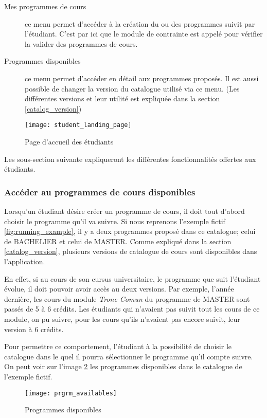 \begin{description}
  \item[Mes programmes de cours] ce menu permet d'accéder à la création du ou des programmes suivit par l'étudiant. C'est par ici que le module de contrainte est appelé pour vérifier la valider des programmes de cours. 
  \item[Programmes disponibles] ce menu permet d'accéder en détail aux programmes proposés. Il est aussi possible de changer la version du catalogue utilisé via ce menu. (Les différentes versions et leur utilité est expliquée dans la section \ref{catalog_version})
\end{description}
\begin{figure}
\centering
\caption{Page d’accueil des étudiants}
\label{fig:student_landing_page}
\texttt{[image: student\_landing\_page]}
\end{figure}

Les sous-section suivante expliqueront les différentes fonctionnalités offertes aux étudiants. 


\subsubsection{Accéder au programmes de cours disponibles}
Lorsqu'un étudiant désire créer un programme de cours, il doit tout d'abord choisir le programme qu'il va suivre. Si nous reprenons l'exemple fictif \ref{fig:running_example}, il y a deux programmes proposé dans ce catalogue; celui de BACHELIER et celui de MASTER. Comme expliqué dans la section \ref{catalog_version}, plusieurs versions de catalogue de cours sont disponibles dans l'application. 

En effet, si au cours de son cursus universitaire, le programme que suit l'étudiant évolue, il doit pouvoir avoir accès au deux versions. Par exemple, l'année dernière, les cours du module \textit{Tronc Comun} du programme de MASTER sont passés de 5 à 6 crédits. Les étudiants qui n'avaient pas suivit tout les cours de ce module, on pu suivre, pour les cours qu'ils n'avaient pas encore suivit, leur version à 6 crédits. 

Pour permettre ce comportement, l'étudiant à la possibilité de choisir le catalogue dans le quel il pourra sélectionner le programme qu'il compte suivre. On peut voir sur l'image \ref{fig:prgrm_availables} les programmes disponibles dans le catalogue de l'exemple fictif. 

\begin{figure}
\centering
\caption{Programmes disponibles}
\label{fig:prgrm_availables}
\texttt{[image: prgrm\_availables]}
\end{figure}
